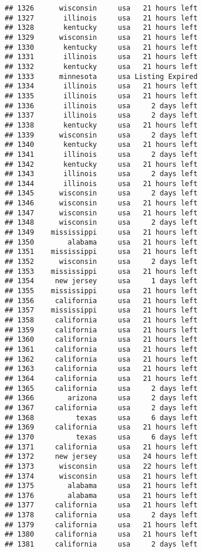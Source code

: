 \documentclass[
]{article}
\begin{document}
\begin{verbatim}
## 1326      wisconsin     usa   21 hours left
## 1327       illinois     usa   21 hours left
## 1328       kentucky     usa   21 hours left
## 1329      wisconsin     usa   21 hours left
## 1330       kentucky     usa   21 hours left
## 1331       illinois     usa   21 hours left
## 1332       kentucky     usa   21 hours left
## 1333      minnesota     usa Listing Expired
## 1334       illinois     usa   21 hours left
## 1335       illinois     usa   21 hours left
## 1336       illinois     usa     2 days left
## 1337       illinois     usa     2 days left
## 1338       kentucky     usa   21 hours left
## 1339      wisconsin     usa     2 days left
## 1340       kentucky     usa   21 hours left
## 1341       illinois     usa     2 days left
## 1342       kentucky     usa   21 hours left
## 1343       illinois     usa     2 days left
## 1344       illinois     usa   21 hours left
## 1345      wisconsin     usa     2 days left
## 1346      wisconsin     usa   21 hours left
## 1347      wisconsin     usa   21 hours left
## 1348      wisconsin     usa     2 days left
## 1349    mississippi     usa   21 hours left
## 1350        alabama     usa   21 hours left
## 1351    mississippi     usa   21 hours left
## 1352      wisconsin     usa     2 days left
## 1353    mississippi     usa   21 hours left
## 1354     new jersey     usa     1 days left
## 1355    mississippi     usa   21 hours left
## 1356     california     usa   21 hours left
## 1357    mississippi     usa   21 hours left
## 1358     california     usa   21 hours left
## 1359     california     usa   21 hours left
## 1360     california     usa   21 hours left
## 1361     california     usa   21 hours left
## 1362     california     usa   21 hours left
## 1363     california     usa   21 hours left
## 1364     california     usa   21 hours left
## 1365     california     usa     2 days left
## 1366        arizona     usa     2 days left
## 1367     california     usa     2 days left
## 1368          texas     usa     6 days left
## 1369     california     usa   21 hours left
## 1370          texas     usa     6 days left
## 1371     california     usa   21 hours left
## 1372     new jersey     usa   24 hours left
## 1373      wisconsin     usa   22 hours left
## 1374      wisconsin     usa   21 hours left
## 1375        alabama     usa   21 hours left
## 1376        alabama     usa   21 hours left
## 1377     california     usa   21 hours left
## 1378     california     usa     2 days left
## 1379     california     usa   21 hours left
## 1380     california     usa   21 hours left
## 1381     california     usa     2 days left

\end{verbatim}
\end{document}
